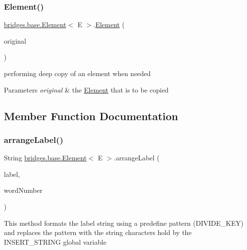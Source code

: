 \subsubsection{\texorpdfstring{Element()}{Element()}\hspace{0.1cm}{\footnotesize\ttfamily [4/4]}}
{\footnotesize\ttfamily \hyperlink{classbridges_1_1base_1_1_element}{bridges.\+base.\+Element}$<$ E $>$.\hyperlink{classbridges_1_1base_1_1_element}{Element} (\begin{DoxyParamCaption}\item[{\hyperlink{classbridges_1_1base_1_1_element}{Element}$<$ E $>$}]{original }\end{DoxyParamCaption})}

performing deep copy of an element when needed


\begin{DoxyParams}{Parameters}
{\em original} & the \hyperlink{classbridges_1_1base_1_1_element}{Element} that is to be copied \\
\hline
\end{DoxyParams}


\subsection{Member Function Documentation}
\hypertarget{classbridges_1_1base_1_1_element_acd2191242df8a7bf2e8b6ced87880ba6}{}\label{classbridges_1_1base_1_1_element_acd2191242df8a7bf2e8b6ced87880ba6} 
\subsubsection{\texorpdfstring{arrange\+Label()}{arrangeLabel()}}
{\footnotesize\ttfamily String \hyperlink{classbridges_1_1base_1_1_element}{bridges.\+base.\+Element}$<$ E $>$.arrange\+Label (\begin{DoxyParamCaption}\item[{String}]{label,  }\item[{int}]{word\+Number }\end{DoxyParamCaption})}

This method formats the label string using a predefine pattern (D\+I\+V\+I\+D\+E\+\_\+\+K\+EY) and replaces the pattern with the string characters hold by the I\+N\+S\+E\+R\+T\+\_\+\+S\+T\+R\+I\+NG global variable


